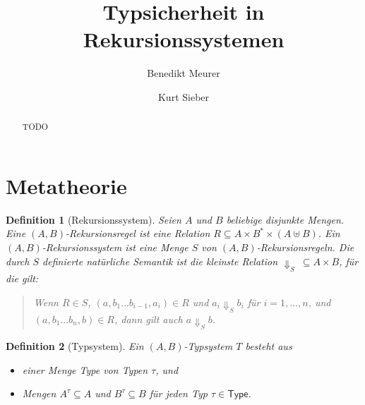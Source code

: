 \documentclass[12pt,a2paper,draft]{article}
\newtheorem{definition}{Definition}
\begin{document}
\title{%
  Typsicherheit in Rekursionssystemen
}
\author{Benedikt Meurer}
\author{Kurt Sieber}
\date{}
\maketitle
\begin{abstract}
  TODO
\end{abstract}


\section{Metatheorie}

\begin{definition}[Rekursionssystem]
  Seien $A$ und $B$ beliebige disjunkte Mengen. Eine \emph{$(A,B)$-Rekursionsregel}
  ist eine Relation $R \subseteq A \times B^* \times (A \uplus B)$. Ein
  \emph{$(A,B)$-Rekursionssystem} ist eine Menge $S$
  von $(A,B)$-Rekursionsregeln.
  Die durch $S$ definierte \emph{nat\"urliche Semantik} ist die kleinste Relation
  $\Downarrow_S\ \subseteq A \times B$, f\"ur die gilt:
  \begin{quote}
    Wenn $R \in S$, $(a,b_1 \ldots b_{i-1},a_i) \in R$ und
    $a_i \Downarrow_S b_i$ f\"ur $i=1,\ldots,n$, und $(a,b_1 \ldots b_n,b) \in R$,
    dann gilt auch $a \Downarrow_S b$.
  \end{quote}
\end{definition}

\begin{definition}[Typsystem]
  Ein \emph{$(A,B)$-Typsystem} $T$ besteht aus
  \begin{itemize}
  \item einer Menge \textsf{Type} von Typen $\tau$, und
  \item Mengen $A^\tau \subseteq A$ und $B^\tau \subseteq B$ f\"ur jeden Typ $\tau \in \textsf{Type}$.
  \end{itemize}
\end{definition}
\end{document}
